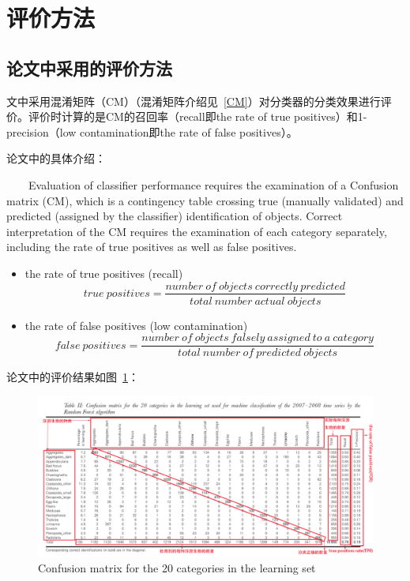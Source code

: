 \documentclass[12pt]{article}
\begin{document}
\section{评价方法}

\subsection{论文中采用的评价方法}
文中采用{\color{blue}混淆矩阵（CM）}（混淆矩阵介绍见~\ref{CM}）对分类器的分类效果进行评价。评价时计算的是CM的召回率（recall即the rate of true positives）和1-precision（low contamination即the rate of false positives）。

论文中的具体介绍：
\begin{tcolorbox}[colback=red!5,colframe=blue!75!black]
~~~~Evaluation of classifier performance requires the examination of a {\color{blue}Confusion matrix (CM)}, which is a contingency table crossing true (manually validated) and predicted (assigned by the classifier) identification of objects. Correct interpretation of the CM requires the examination of each category separately, including {\color{blue}the rate of true positives} as well as {\color{blue}false positives}.
\begin{itemize}
    \item the rate of true positives (recall)
        \begin{displaymath}
            true~positives=\frac{number~of~objects~correctly~predicted}{total~number~actual~objects}
        \end{displaymath}
    \item the rate of false positives (low contamination)
        \begin{displaymath}
            false~positives=\frac{number~of~objects~falsely~assigned~to~a~category}{total~number~of~predicted~objects}
        \end{displaymath}
\end{itemize}
\end{tcolorbox}

论文中的评价结果如图~\ref{fig:cmlearn}：
    \begin{figure}[!ht]
      \centering 
        \includegraphics[width=1\textwidth]{cmlearn}
        \caption{Confusion matrix for the 20 categories in the learning set}
        \label{fig:cmlearn}
    \end{figure}
    
\end{document}
